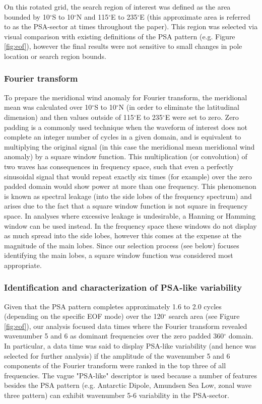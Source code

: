 On this rotated grid, the search region of interest was defined as the area bounded by 10$^{\circ}$S to 10$^{\circ}$N and 115$^{\circ}$E to 235$^{\circ}$E (this approximate area is referred to as the PSA-sector at times throughout the paper). This region was selected via visual comparison with existing definitions of the PSA pattern (e.g. Figure \ref{fig:eof}), however the final results were not sensitive to small changes in pole location or search region bounds.

\subsubsection{Fourier transform}

To prepare the meridional wind anomaly for Fourier transform, the meridional mean was calculated over 10$^{\circ}$S to 10$^{\circ}$N (in order to eliminate the latitudinal dimension) and then values outside of 115$^{\circ}$E to 235$^{\circ}$E were set to zero. Zero padding is a commonly used technique when the waveform of interest does not complete an integer number of cycles in a given domain, and is equivalent to multiplying the original signal (in this case the meridional mean meridional wind anomaly) by a square window function. This multiplication (or convolution) of two waves has consequences in frequency space, such that even a perfectly sinusoidal signal that would repeat exactly six times (for example) over the zero padded domain would show power at more than one frequency. This phenomenon is known as spectral leakage (into the side lobes of the frequency spectrum) and arises due to the fact that a square window function is not square in frequency space. In analyses where excessive leakage is undesirable, a Hanning or Hamming window can be used instead. In the frequency space these windows do not display as much spread into the side lobes, however this comes at the expense at the magnitude of the main lobes. Since our selection process (see below) focuses identifying the main lobes, a square window function was considered most appropriate.

\subsubsection{Identification and characterization of PSA-like variability}

Given that the PSA pattern completes approximately 1.6 to 2.0 cycles (depending on the specific EOF mode) over the 120$^{\circ}$ search area (see Figure \ref{fig:eof}), our analysis focused data times where the Fourier transform revealed wavenumber 5 and 6 as dominant frequencies over the zero padded 360$^{\circ}$ domain. In particular, a data time was said to display PSA-like variability (and hence was selected for further analysis) if the amplitude of the wavenumber 5 and 6 components of the Fourier transform were ranked in the top three of all frequencies. The vague "PSA-like" descriptor is used because a number of features besides the PSA pattern (e.g. Antarctic Dipole, Amundsen Sea Low, zonal wave three pattern) can exhibit wavenumber 5-6 variability in the PSA-sector.

